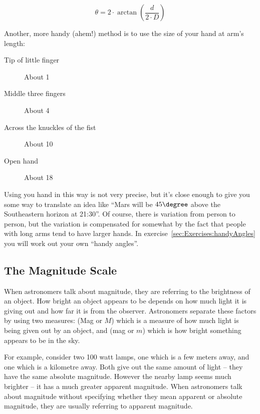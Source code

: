 \begin{equation}
\label{eq:handyAngle}
\theta=2 \cdot \arctan{\left(\frac{d}{2 \cdot D}\right) }
\end{equation}


\noindent Another, more handy (ahem!) method is to use the size of your hand at
arm's length:

\begin{description}
\item[Tip of little finger] About 1\degree 
\item[Middle three fingers] About 4\degree 
\item[Across the knuckles of the fist] About 10\degree 
\item[Open hand] About 18\degree
\end{description}

Using you hand in this way is not very precise, but it's close enough
to give you some way to translate an idea like ``Mars will be
$45\degree$ above the Southeastern horizon at 21:30''. Of course,
there is variation from person to person, but the variation is
compensated for somewhat by the fact that people with long arms tend
to have larger hands. In exercise~\ref{sec:Exercises:handyAngles} you
will work out your own ``handy angles''.



\subsection{The Magnitude Scale}
\label{sec:Concepts:Magnitudes}


When astronomers talk about magnitude, they are referring to the
brightness of an object. How bright an object appears to be depends on
how much light it is giving out and how far it is from the observer.
Astronomers separate these factors by using two measures:  (Mag or $M$) which is a measure of how much light is being
given out by an object, and  (mag or $m$) which
is how bright something appears to be in the sky.

For example, consider two 100 watt lamps, one which is a few meters
away, and one which is a kilometre away. Both give out the same amount
of light -- they have the same absolute magnitude. However the nearby
lamp seems much brighter -- it has a much greater apparent magnitude.
When astronomers talk about magnitude without specifying whether they
mean apparent or absolute magnitude, they are usually referring to
apparent magnitude.

